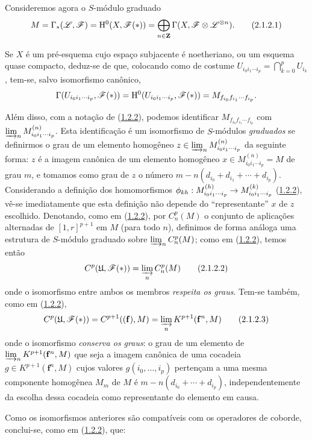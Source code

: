 \begin{env}[2.1.2]
\label{III.2.1.2}
Consideremos agora o $S$-módulo graduado 
\[
\label{III.2.1.2.1}
  M = \Gamma_*(\sh{L},\sh{F}) = \HH^0(X,\sh{F}(*)) = \bigoplus_{n\in\bb{Z}} \Gamma(X,\sh{F}\otimes\sh{L}^{\otimes n}).
  \tag{2.1.2.1}
\]

Se $X$ é um pré-esquema cujo espaço subjacente é noetheriano, ou um esquema quase compacto, deduz-se de  que, colocando como de costume $U_{i_0 i_1\cdots i_p} = \bigcap_{k=0}^p U_{i_k}$, tem-se, salvo isomorfismo canônico,
\[
  \Gamma(U_{i_0 i_1\cdots i_p},\mathscr{F}(*)) = \mathrm{H}^0(U_{i_0 i_1\cdots i_p},\mathscr{F}(*)) = M_{f_{i_0}f_{i_1}\cdots f_{i_p}}.
\]

Além disso, com a notação de (\hyperref[III.1.2.2]{1.2.2}), podemos identificar $M_{f_{i_0}f_{i_1}\cdots f_{i_p}}$ com $\varinjlim_n M_{i_0 i_1\cdots i_p}^{(n)}$.
Esta identificação é um isomorfismo de $S$-módulos \emph{graduados} se definirmos o grau de um elemento homogêneo $z\in\varinjlim_n M_{i_0 i_1\cdots i_p}^{(n)}$ da seguinte forma: $z$ é a imagem canônica de um elemento homogêneo $x\in M_{i_0 i_1\cdots i_p}^{(n)} = M$ de grau $m$, e tomamos como grau de $z$ o número $m-n(d_{i_0}+d_{i_1}+\cdots+d_{i_p})$.
Considerando a definição dos homomorfismos $\vphi_{kh}:M_{i_0 i_1\cdots i_p}^{(h)}\to M_{i_0 i_1\cdots i_p}^{(k)}$ (\hyperref[III.1.2.2]{1.2.2}), vê-se imediatamente que esta definição não depende do ``representante'' $x$ de $z$ escolhido.
Denotando, como em (\hyperref[III.1.2.2]{1.2.2}), por $C_n^p(M)$ o conjunto de aplicações alternadas de $[1,r]^{p+1}$ em $M$ (para todo $n$), definimos de forma análoga uma estrutura de $S$-módulo graduado sobre $\varinjlim_n C_n^p(M)$; como em (\hyperref[III.1.2.2]{1.2.2}), temos então
\[
\label{III.2.1.2.2}
  C^p(\mathfrak{U},\sh{F}(*)) = \varinjlim_n C_n^p(M)
  \tag{2.1.2.2}
\]
onde o isomorfismo entre ambos os membros \emph{respeita os graus}.
Tem-se também, como em (\hyperref[III.1.2.2]{1.2.2}),
\[
\label{III.2.1.2.3}
  C^p(\mathfrak{U},\sh{F}(*)) = C^{p+1}((\mathbf{f}),M) = \varinjlim_n K^{p+1}(\mathbf{f}^n,M)
  \tag{2.1.2.3}
\]
onde o isomorfismo \emph{conserva os graus}: o grau de um elemento de $\varinjlim_n K^{p+1}(\mathbf{f}^n,M)$ que seja a imagem canônica de uma cocadeia $g\in K^{p+1}(\mathbf{f}^n,M)$ cujos valores $g(i_0,\dots,i_p)$ pertençam a uma mesma componente homogênea $M_m$ de $M$ é $m-n(d_{i_0}+\cdots+d_{i_p})$, independentemente da escolha dessa cocadeia como representante do elemento em causa.

Como os isomorfismos anteriores são compatíveis com os operadores de coborde, conclui-se, como em (\hyperref[III.1.2.2]{1.2.2}), que:
\end{env}

